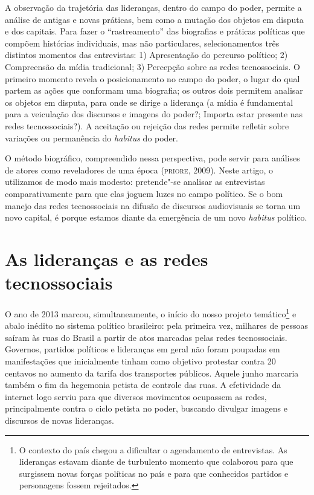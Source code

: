 A observação da trajetória das lideranças, dentro do campo do poder,
permite a análise de antigas e novas práticas, bem como a mutação dos
objetos em disputa e dos capitais. Para fazer o ``rastreamento'' das
biografias e práticas políticas que compõem histórias individuais, mas
não particulares, selecionamentos três distintos momentos das
entrevistas: 1) Apresentação do percurso político; 2) Compreensão da
mídia tradicional; 3) Percepção sobre as redes tecnossociais. O primeiro
momento revela o posicionamento no campo do poder, o lugar do qual
partem as ações que conformam uma biografia; os outros dois permitem
analisar os objetos em disputa, para onde se dirige a liderança (a mídia
é fundamental para a veiculação dos discursos e imagens do poder?;
Importa estar presente nas redes tecnossociais?). A aceitação ou
rejeição das redes permite refletir sobre variações ou permanência do
\emph{habitus} do poder.

O método biográfico, compreendido nessa perspectiva, pode servir para
análises de atores como reveladores de uma época (\textsc{priore}, 2009). Neste
artigo, o utilizamos de modo mais modesto: pretende"-se analisar as
entrevistas comparativamente para que elas joguem luzes no campo
político. Se o bom manejo das redes tecnossociais na difusão de
discursos audiovisuais se torna um novo capital, é porque estamos diante
da emergência de um novo \emph{habitus} político.

\section{As lideranças e as redes tecnossociais}

O ano de 2013 marcou, simultaneamente, o início do nosso projeto
temático\footnote{O contexto do país chegou a dificultar o agendamento
  de entrevistas. As lideranças estavam diante de turbulento momento que
  colaborou para que surgissem novas forças políticas no país e para que
  conhecidos partidos e personagens fossem rejeitados.} e abalo inédito
no sistema político brasileiro: pela primeira vez, milhares de pessoas
saíram às ruas do Brasil a partir de atos marcadas pelas redes
tecnossociais. Governos, partidos políticos e lideranças em geral não
foram poupadas em manifestações que inicialmente tinham como objetivo
protestar contra 20 centavos no aumento da tarifa dos transportes
públicos. Aquele junho marcaria também o fim da hegemonia petista de
controle das ruas. A efetividade da internet logo serviu para que
diversos movimentos ocupassem as redes, principalmente contra o ciclo
petista no poder, buscando divulgar imagens e discursos de novas
lideranças.

